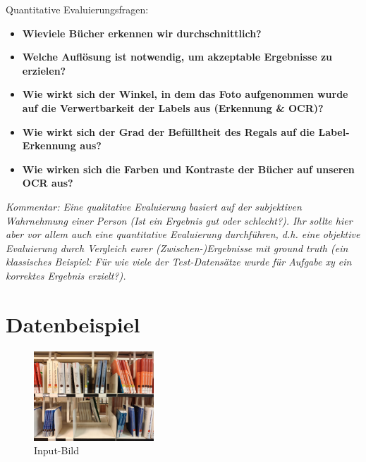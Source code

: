 \documentclass[deutsch]{scrartcl}
\begin{document}
Quantitative Evaluierungsfragen:
\begin{itemize}
	\item \textbf{Wieviele Bücher erkennen wir durchschnittlich?}\\
	\item \textbf{Welche Auflösung ist notwendig, um akzeptable Ergebnisse zu erzielen?}\\
	\item \textbf{Wie wirkt sich der Winkel, in dem das Foto aufgenommen wurde auf die Verwertbarkeit der Labels aus (Erkennung \& OCR)?}\\
	\item \textbf{Wie wirkt sich der Grad der Befülltheit des Regals auf die Label-Erkennung aus?}\\
	\item \textbf{Wie wirken sich die Farben und Kontraste der Bücher auf unseren OCR aus?}\\
\end{itemize}
\textit{Kommentar: Eine qualitative Evaluierung basiert auf der subjektiven Wahrnehmung einer Person (Ist ein Ergebnis gut oder schlecht?). Ihr sollte hier aber vor allem auch eine quantitative Evaluierung durchführen, d.h. eine objektive Evaluierung durch Vergleich eurer (Zwischen-)Ergebnisse mit ground truth (ein klassisches Beispiel: Für wie viele der Test-Datensätze wurde für Aufgabe xy ein korrektes Ergebnis erzielt?).}
\section{Datenbeispiel}
\begin{figure}[H]
 \centering
 \includegraphics[width=0.4\textwidth]{input.jpg}
 \caption{Input-Bild}
 \label{fig:img}
\end{figure}
\end{document}
